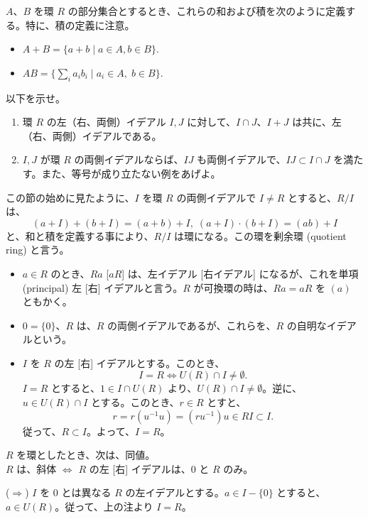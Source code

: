 $A$、$B$ を環 $R$ の部分集合とするとき、これらの和および積を次のように定義する。特に、積の定義に注意。
\begin{itemize}
\item $A + B = \{a + b\mid a\in A, b\in B\}$.
\item $AB = \{\sum_ia_ib_i \mid a_i\in A, \;b\in B\}$.
\end{itemize}

\begin{ex} 以下を示せ。
\begin{enumerate}
\item 環 $R$ の左（右、両側）イデアル $I, J$ に対して、$I\cap J$、$I+J$ は共に、左（右、両側）イデアルである。
\item $I, J$ が環 $R$ の両側イデアルならば、$IJ$ も両側イデアルで、$IJ\subset I\cap J$ を満たす。また、等号が成り立たない例をあげよ。
\end{enumerate}
\end{ex}

この節の始めに見たように、$I$ を環 $R$ の両側イデアルで $I\neq R$ とすると、$R/I$ は、
$$(a + I) + (b + I) = (a+b) + I, \; (a + I)\cdot (b + I) = (ab) + I$$
と、和と積を定義する事により、$R/I$ は環になる。この環を剰余環 (quotient ring) と言う。

\begin{itemize}
\item $a\in R$ のとき、$Ra$ [$aR$] は、左イデアル [右イデアル] になるが、これを単項 (principal) 左 [右] イデアルと言う。$R$ が可換環の時は、$Ra = aR$ を $(a)$ ともかく。
\item $0 = \{0\}$、$R$ は、$R$ の両側イデアルであるが、これらを、$R$ の自明なイデアルという。
\item $I$ を $R$ の左 [右] イデアルとする。このとき、
$$I = R \Leftrightarrow U(R)\cap I \neq \emptyset.$$
\pf $I = R$ とすると、$1\in I\cap U(R)$ より、$U(R)\cap I \neq \emptyset$。逆に、$u\in U(R)\cap I$ とする。このとき、$r\in R$ とすと、
$$r = r(u^{-1}u) = (ru^{-1})u \in RI \subset I.$$
従って、$R \subset I$。よって、$I = R$。
\end{itemize}

\begin{prop}\label{prop:field}
$R$ を環としたとき、次は、同値。\\
$R$ は、斜体 $\Leftrightarrow$ $R$ の左 {\rm [右]} イデアルは、$0$ と $R$ のみ。
\end{prop}
\proof
($\Rightarrow$)  $I$ を $0$ とは異なる $R$ の左イデアルとする。$a\in I - \{0\}$ とすると、$a\in U(R)$。従って、上の注より $I = R$。

